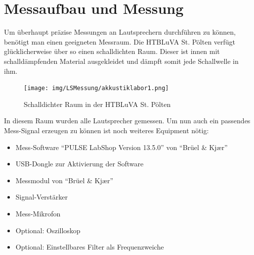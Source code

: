 
\section{Messaufbau und Messung}\label{sec:5.2}
Um überhaupt präzise Messungen an Lautsprechern durchführen zu können, benötigt man einen geeigneten Messraum. Die HTBLuVA St. Pölten verfügt glücklicherweise über so einen schalldichten Raum. Dieser ist innen mit schalldämpfenden Material ausgekleidet und dämpft somit jede Schallwelle in ihm. 
\begin{figure} [H]
	\centering
	\texttt{[image: img/LSMessung/akkustiklabor1.png]}
	\caption{Schalldichter Raum in der HTBLuVA St. Pölten}
	\label{fig:5.2.1}
\end{figure}
In diesem Raum wurden alle Lautsprecher gemessen. Um nun auch ein passendes Mess-Signal erzeugen zu können ist noch weiteres Equipment nötig:
\begin{itemize}
	\item Mess-Software \enquote{PULSE LabShop Version 13.5.0} von \enquote{Brüel \& Kj\ae r}
	\item USB-Dongle zur Aktivierung der Software
	\item Messmodul von \enquote{Brüel \& Kj\ae r}
	\item Signal-Verstärker
	\item Mess-Mikrofon
	\item Optional: Oszilloskop
	\item Optional: Einstellbares Filter als Frequenzweiche
\end{itemize}

